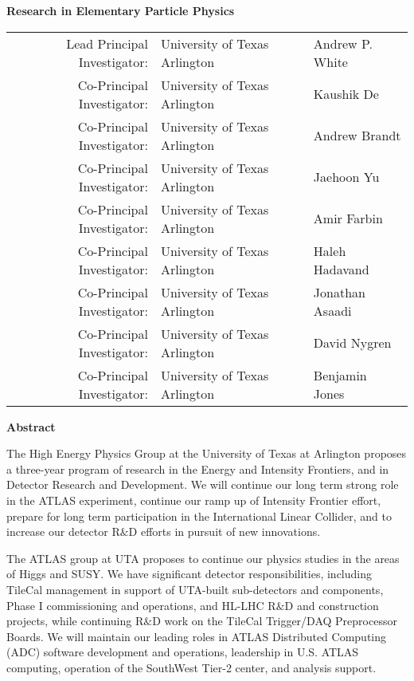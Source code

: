 \documentclass[preprint,11pt]{article}
\begin{document}
\begin{center}
\textbf{Research in Elementary Particle Physics}

\begin{table}[htb]
\centering
\renewcommand{\arraystretch}{1.15}
\begin{tabular}{rll} %
    Lead Principal Investigator: & University of Texas Arlington & Andrew P. White  \\
    Co-Principal Investigator:   & University of Texas Arlington & Kaushik De                       \\
    Co-Principal Investigator:   & University of Texas Arlington & Andrew Brandt                    \\
    Co-Principal Investigator:   & University of Texas Arlington & Jaehoon Yu                       \\
    Co-Principal Investigator:   & University of Texas Arlington & Amir Farbin                      \\
	Co-Principal Investigator:   & University of Texas Arlington & Haleh Hadavand                   \\
	Co-Principal Investigator:   & University of Texas Arlington & Jonathan Asaadi                  \\
	Co-Principal Investigator:   & University of Texas Arlington & David Nygren                     \\
	Co-Principal Investigator:   & University of Texas Arlington & Benjamin Jones                   \\

	\end{tabular}
\renewcommand{\arraystretch}{1.0}
\end{table}

\end{center}

\noindent \textbf{\Large Abstract}

The High Energy Physics Group at the University of Texas at Arlington proposes a three-year program of research in the Energy and Intensity Frontiers, and in Detector Research and Development. We will continue our long term strong role in the ATLAS experiment, continue our ramp up of Intensity Frontier effort, prepare for long term participation in the International Linear Collider, and to increase our detector R$\&$D efforts in pursuit of new innovations.

The ATLAS group at UTA proposes to continue our physics studies in the areas of Higgs and SUSY. We have significant detector responsibilities, including TileCal management in support of UTA-built sub-detectors and components, Phase I commissioning and operations, and HL-LHC R$\&$D and construction projects, while continuing R$\&$D work on the TileCal Trigger/DAQ Preprocessor Boards. We will maintain our leading roles in ATLAS Distributed Computing (ADC) software development and operations, leadership in U.S. ATLAS computing, operation of the SouthWest Tier-2 center, and analysis support. 
\end{document}
